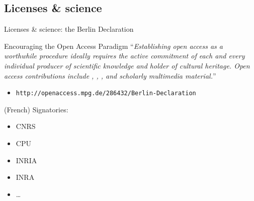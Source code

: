 \documentclass[10pt,xcolor=svgnames]{beamer}
\begin{document}
\subsection{Licenses \& science}
\begin{frame}{Licenses \& science: the Berlin Declaration}

  \begin{block}{Encouraging the Open Access Paradigm}
    ``\emph{Establishing open access as a worthwhile procedure ideally requires the active commitment of each and every individual producer of scientific knowledge and holder of cultural heritage. Open access contributions include , , ,  and scholarly multimedia material.}''

    \begin{itemize}
      \item {\small \texttt{http://openaccess.mpg.de/286432/Berlin-Declaration}}
    \end{itemize}
  \end{block}

  \begin{block}{(French) Signatories:}
    \begin{itemize}
      \item CNRS
      \item CPU
      \item INRIA
      \item INRA
      \item \ldots
    \end{itemize}
  \end{block}

\end{frame}
\end{document}
